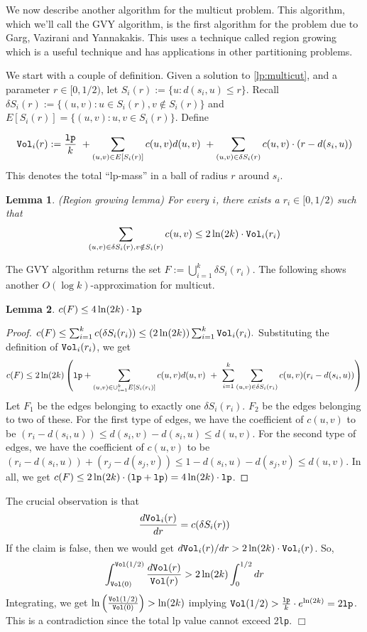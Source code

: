\documentclass[11pt]{article}
\newtheorem{lemma}{Lemma}
\def\lp{{\tt lp}}
\newenvironment{proofof}[1]{\smallskip\noindent{\bf Proof of #1:}}%
        {\hspace*{\fill}$\Box$\par}
\begin{document}
\noindent
We now describe another algorithm for the multicut problem. This algorithm, which we'll call the GVY algorithm, is the first algorithm for the problem due to Garg, Vazirani and Yannakakis. This uses a technique called region growing which is a
useful technique and has applications in other partitioning problems.
\medskip

\def\Vol{{\tt Vol}}
\noindent
We start with a couple of definition. Given a solution to \eqref{lp:multicut}, and a parameter $r\in [0,1/2)$, let 
$S_i(r) := \{u: d(s_i,u) \le r\}$. Recall $\delta S_i(r) := \{(u,v): u\in S_i(r), v\notin S_i(r)\}$ and 
$E[S_i(r)] = \{(u,v):u,v \in S_i(r)\}$. 
Define

\begin{equation}\label{eq:voldefn}
\Vol_i(r) := \frac{\lp}{k} ~ + \sum_{(u,v)\in E[S_i(r)]} c(u,v)d(u,v) ~+ \sum_{(u,v)\in \delta S_i(r)} c(u,v)\cdot\left(r - d(s_i,u)\right)
\end{equation}
This denotes the total ``lp-mass'' in a ball of radius $r$ around $s_i$.
\begin{lemma}\label{lem:region}
(Region growing lemma)
For every $i$, there exists a $r_i \in [0,1/2)$ such that 
$$ \sum_{(u,v)\in \delta S_i(r),v\notin S_i(r)} c(u,v) \le 2\ln (2k) \cdot\Vol_i(r_i) $$
\end{lemma}
\noindent
The GVY algorithm returns the set $F := \bigcup_{i=1}^k \delta S_i(r_i)$. The following shows 
another $O(\log k)$-approximation for multicut.
\begin{lemma}
$c(F) \le 4\ln (2k)\cdot \lp$
\end{lemma}
\begin{proof}
$c(F) \le \sum_{i=1}^k c(\delta S_i(r_i)) \le (2\ln (2k)) \sum_{i=1}^k \Vol_i(r_i).$ Substituting the definition of 
$\Vol_i(r_i)$, we get
$$c(F) \le 2\ln (2k)\left(\lp + \sum_{(u,v)\in \cup_{i=1}^k E[S_i(r_i)]}c(u,v)d(u,v) ~+~ \sum_{i=1}^k\sum_{(u,v)\in \delta S_i(r_i)} c(u,v)(r_i - d(s_i,u))\right)$$
Let $F_1$ be the edges belonging to exactly one $\delta S_i(r_i)$. $F_2$ be the edges belonging to two of these.
For the first type of edges, we have the coefficient of $c(u,v)$ to be $(r_i - d(s_i,u)) \le d(s_i,v) - d(s_i,u) \le d(u,v)$.
For the second type of edges, we have the coefficient of $c(u,v)$ to be 
$(r_i - d(s_i,u)) + (r_j - d(s_j,v)) \le 1 - d(s_i,u) - d(s_j,v) \le d(u,v)$. In all, we get
$c(F) \le 2\ln (2k)\cdot (\lp + \lp) = 4\ln (2k)\cdot \lp$.
\end{proof}

\begin{proofof}{Region growing lemma}
The crucial observation is that 
$$\frac{d \Vol_i(r)}{dr} = c(\delta S_i(r))$$
If the claim is false, then we would get $d\Vol_i(r)/dr > 2\ln (2k)\cdot \Vol_i(r)$.
So,
$$\int_{\Vol(0)}^{\Vol(1/2)}\frac{d\Vol(r)}{\Vol(r)} > 2\ln (2k) \int_{0}^{1/2} dr$$
\noindent
Integrating, we get 
$\ln\left(\frac{\Vol(1/2)}{\Vol(0)}\right) > \ln (2k)$ implying 
$\Vol(1/2) > \frac{\lp}{k}\cdot e^{\ln (2k)} = 2\lp$.
This is a contradiction since the total lp value cannot exceed 2\lp.
\end{proofof}
\end{document}
